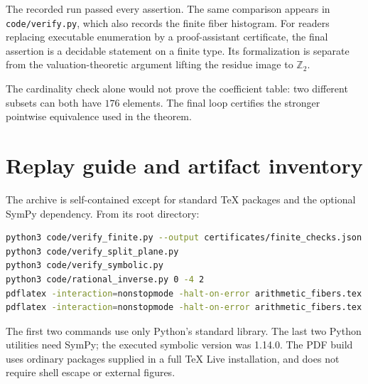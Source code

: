 \documentclass[11pt]{article}
\numberwithin{equation}{section}
\theoremstyle{plain}
\theoremstyle{plain}
\theoremstyle{plain}
\theoremstyle{definition}
\theoremstyle{definition}
\theoremstyle{definition}
\theoremstyle{remark}
\newcommand{\Z}{\mathbb Z}\newcommand{\Q}{\mathbb Q}
\newcommand{\rpath}[1]{\nolinkurl{#1}}
\begin{document}
The recorded run passed every assertion. The same comparison appears in
\rpath{code/verify.py}, which also records the finite fiber histogram.
For readers replacing executable enumeration by a proof-assistant
certificate, the final assertion is a decidable statement on a finite
type. Its formalization is separate from the valuation-theoretic
argument lifting the residue image to $\Z_2$.

The cardinality check alone would not prove the coefficient table:
two different subsets can both have $176$ elements. The final loop
certifies the stronger pointwise equivalence used in the theorem.

\clearpage
{}
\appendix
\section{Replay guide and artifact inventory}\label{alg:app:replay}
The archive is self-contained except for standard TeX packages and the
optional SymPy dependency. From its root directory:
\begin{lstlisting}[language=bash]
python3 code/verify_finite.py --output certificates/finite_checks.json
python3 code/verify_split_plane.py
python3 code/verify_symbolic.py
python3 code/rational_inverse.py 0 -4 2
pdflatex -interaction=nonstopmode -halt-on-error arithmetic_fibers.tex
pdflatex -interaction=nonstopmode -halt-on-error arithmetic_fibers.tex
\end{lstlisting}
The first two commands use only Python's standard library. The last two
Python utilities need SymPy; the executed symbolic version was 1.14.0.
The PDF build uses ordinary packages supplied in a full TeX Live
installation, and does not require shell escape or external figures.
\end{document}

